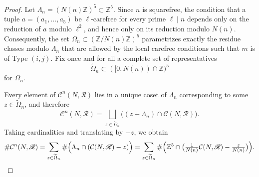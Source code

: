 \documentclass[10pt,a4paper]{amsart}
\begin{document}
\begin{proof}
Let $\Lambda_n=(N(n)\mathbb{Z})^5\subset\mathbb{Z}^5$. Since $n$ is squarefree,
the condition that a tuple $a=(a_1,\dots,a_5)$ be $\ell$-carefree for every
prime $\ell\mid n$ depends only on the reduction of $a$ modulo $\ell^2$, and
hence only on its reduction modulo $N(n)$. Consequently, the set
$\Omega_n\subset(\mathbb{Z}/N(n)\mathbb{Z})^5$ parametrizes exactly the residue
classes modulo $\Lambda_n$ that are allowed by the local carefree conditions such that $m$ is of Type $(i,j)$.
Fix once and for all a complete set of representatives
\[
\widetilde{\Omega}_n\subset ([0,N(n))\cap\mathbb{Z})^5
\]
for $\Omega_n$.

Every element of $\mathcal{C}^n(N,\mathscr{R})$ lies in a unique coset of $\Lambda_n$
corresponding to some $z\in\widetilde{\Omega}_n$, and therefore
\[
\mathcal{C}^n(N,\mathscr{R})
=
\bigsqcup_{z\in\widetilde{\Omega}_n}
\bigl((z+\Lambda_n)\cap\mathcal{C}(N,\mathscr{R})\bigr).
\]
Taking cardinalities and translating by $-z$, we obtain
\[
\#\mathcal{C}^n(N,\mathscr{R})
=
\sum_{z\in\widetilde{\Omega}_n}
\#\Bigl(\Lambda_n\cap(\mathcal{C}(N,\mathscr{R})-z)\Bigr)
=
\sum_{z\in\widetilde{\Omega}_n}
\#\Bigl(\mathbb{Z}^5\cap\bigl(\tfrac{1}{N(n)}\mathcal{C}(N,\mathscr{R})-\tfrac{z}{N(n)}\bigr)\Bigr).
\]


\end{proof}
\end{document}
